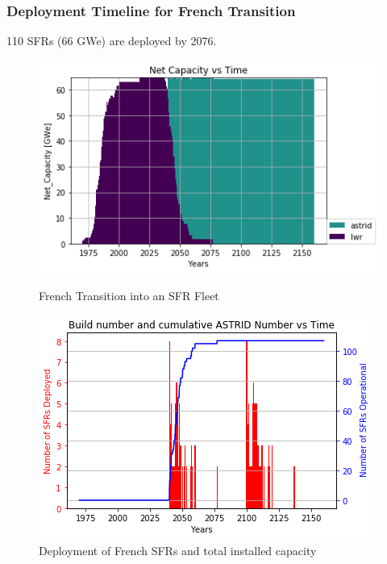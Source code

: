 \begin{frame}
	\frametitle{Deployment Timeline for French Transition}
	110 SFRs (66 GWe) are deployed by 2076.
	\begin{figure}[htbp!]
	\begin{minipage}[b]{.45\linewidth}
        \begin{center}
                \includegraphics[width=\textwidth]{./images/french-transition/power_plot.png}
        \end{center}
        \caption{French Transition into an SFR Fleet}
        \label{fig:sfr_num}
	\end{minipage}
	\hspace{.5cm}
	\begin{minipage}[b]{.45\linewidth}
		\centering
		\includegraphics[width=\textwidth]{./images/french-transition/sfr_deploy.png}
		\caption{Deployment of French SFRs and total installed capacity}
		\label{fig:dep}
	\end{minipage}
\end{figure}
\end{frame}



